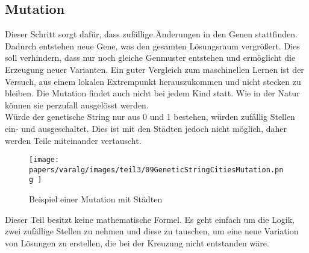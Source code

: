 %
%
%
%
\subsection{Mutation
\label{buch:paper:varalg:subsection:mutation}}
Dieser Schritt sorgt dafür, dass zufällige Änderungen in 
den Genen stattfinden. Dadurch entstehen neue Gene, was den 
gesamten Lösungsraum vergrößert. Dies soll verhindern, 
dass nur noch gleiche Genmuster entstehen und ermöglicht 
die Erzeugung neuer Varianten. Ein guter Vergleich zum 
maschinellen Lernen ist der Versuch, aus einem lokalen 
Extrempunkt herauszukommen und nicht stecken zu bleiben.
Die Mutation findet auch nicht bei jedem Kind statt. Wie 
in der Natur können sie perzufall ausgelösst werden.
\\
Würde der genetische String nur aus 0 und 1 bestehen, 
würden zufällig Stellen ein- und ausgeschaltet. Dies 
ist mit den Städten jedoch nicht möglich, daher werden 
Teile miteinander vertauscht.

\begin{figure}
	\centering
	\texttt{[image: 
        papers/varalg/images/teil3/09GeneticStringCitiesMutation.png
        ]}
	\caption{Beispiel einer Mutation mit Städten}
	\label{fig:mutation_genetic_string}
\end{figure}

Dieser Teil besitzt keine mathematische Formel. Es geht einfach 
um die Logik, zwei zufällige Stellen zu nehmen und diese zu 
tauschen, um eine neue Variation von Lösungen zu erstellen, die 
bei der Kreuzung nicht entstanden wäre.
